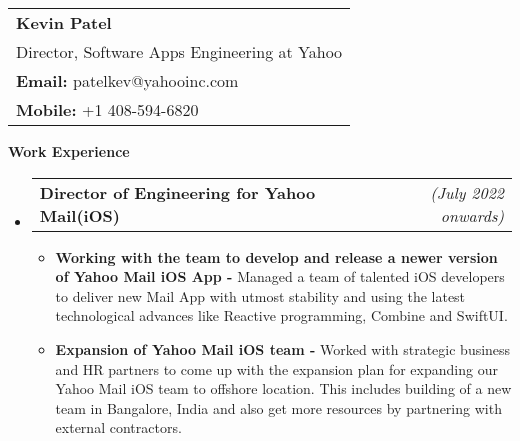 \documentclass[a4paper,11pt,times]{res}
\makeatletter
\newcommand{\smalitem}[1]{\item #1 \vspace{-4pt}}
\newcommand{\resheading}[1]{{\large \colorbox{mygrey}{\begin{minipage}{\textwidth}{\textbf{#1 \vphantom{p\^{E}}}}\end{minipage}}\vspace{4pt}}}
\newcommand{\mysubheading}[2]{
\begin{tabular*}{172mm}{l@{\extracolsep{\fill}}r}
		\textbf{#1} & \textit{#2} \\
\end{tabular*}\vspace{-1pt}}
\makeatother
\begin{document}
\vspace{-2pt}
\begin{tabular*}{160mm}{l}
\textbf{Kevin Patel} \\
Director, Software Apps Engineering at Yahoo \\
\textbf{Email:} patelkev@yahooinc.com \\
\textbf{Mobile:} +1 408-594-6820 \\
\end{tabular*}

\resheading{Work Experience}
\begin{itemize}

\item
\mysubheading{Director of Engineering for Yahoo Mail(iOS) }{(July 2022 onwards)}
\begin{itemize}
\vspace{-2pt}
\smalitem{\textbf{Working with the team to develop and release a newer version of Yahoo Mail iOS App -} Managed a team of talented iOS developers to deliver new Mail App with utmost stability and using the latest technological advances like Reactive programming, Combine and SwiftUI.}
\smalitem{\textbf{Expansion of Yahoo Mail iOS team -} Worked with strategic business and HR partners to come up with the expansion plan for expanding our Yahoo Mail iOS team to offshore location. This includes building of a new team in Bangalore, India and also get more resources by partnering with external contractors. }
\end{itemize}

\vspace{2pt}


\end{itemize}
\end{document}
